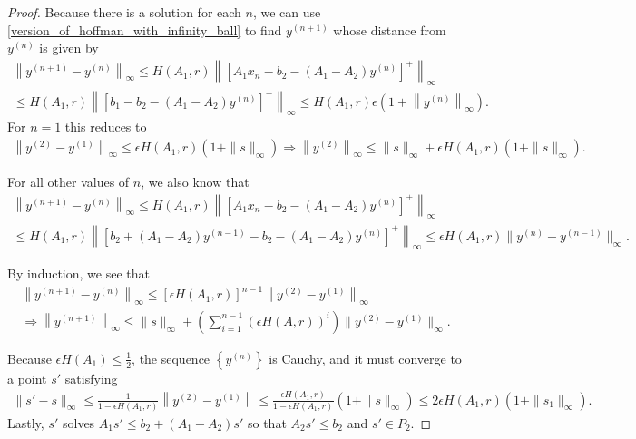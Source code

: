 \documentclass{article}
\theoremstyle{case}
\numberwithin{theorem}{subsection}
\begin{document}
\begin{proof}

Because there is a solution for each $n$, we can use \cref{version_of_hoffman_with_infinity_ball} 
to find $y^{(n+1)}$ whose distance from $y^{(n)}$ is given by
\begin{align*}
\left\|y^{(n+1)} - y^{(n)}\right\|_\infty 
\le  H\left(A_1, r\right) \left\|\left[A_1x_n - b_2 - (A_1 - A_2)y^{(n)}\right ]^+\right\|_\infty \\
\le  H\left(A_1, r\right)\left\|\left[b_1 - b_2 - (A_1 - A_2)y^{(n)} \right]^+\right\|_\infty
\le  H\left(A_1, r\right) \epsilon\left(1 + \left\|y^{(n)} \right\|_\infty\right).
\end{align*}
For $n=1$ this reduces to
\begin{align*}
\left\|y^{(2)} - y^{(1)}\right\|_\infty \le \epsilon H\left(A_1, r\right) (1 + \|s\|_\infty)
\Longrightarrow \left\|y^{(2)}\right\|_\infty \le \|s\| _\infty+ \epsilon H\left(A_1, r\right)(1 + \|s\|_\infty).
\end{align*}

For all other values of $n$, we also know that
\begin{align*}
\left\|y^{(n+1)} - y^{(n)}\right\|_\infty \le  H\left(A_1, r\right)\left\|\left[A_1x_n - b_2 - (A_1 - A_2)y^{(n)}\right]^+\right\|_\infty \\
\le  H\left(A_1, r\right)\left\|[b_2 + (A_1 - A_2)y^{(n-1)} - b_2 - (A_1 - A_2)y^{(n)}]^+\right\|_\infty
\le \epsilon  H\left(A_1, r\right)  \|y^{(n)}-y^{(n-1)}\|_\infty.
\end{align*}

By induction, we see that
\begin{align*}
\left\|y^{(n+1)} - y^{(n)}\right \|_\infty 
\le \left[\epsilon H\left(A_1, r\right)\right]^{n-1}\left\|y^{(2)} - y^{(1)}\right\|_\infty \\
\Longrightarrow \left\|y^{(n+1)}\right\|_\infty 
\le \|s\|_\infty + \left( \sum_{i=1}^{n-1}\left( \epsilon H(A, r)\right)^i\right) \|y^{(2)} - y^{(1)}\|_\infty .
\end{align*}

Because $\epsilon H(A_1)\le\frac 1 2$, the sequence $\left\{y^{(n)}\right\}$ is Cauchy, and it must converge to a point $s'$ satisfying
\begin{align*}
\|s' - s\|_\infty 
\le \frac{1}{1 - \epsilon H\left(A_1, r\right)}\left\|y^{(2)} - y^{(1)}\right\| 
\le \frac{\epsilon H\left(A_1, r\right)}{1 - \epsilon H\left(A_1, r\right)}\left(1 + \|s\|_{\infty}\right)
\le 2\epsilon H\left(A_1, r\right)\left(1 + \|s_1\|_{\infty}\right).
\end{align*}
Lastly, $s'$ solves $A_1s' \le b_2 + (A_1 - A_2)s'$ so that $A_2s' \le b_2$ and $s' \in P_2$.
\end{proof}
\end{document}
